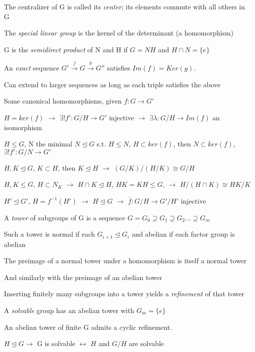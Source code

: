 \documentclass[12pt]{article}
\begin{document}
The centralizer of G is called its \textit{center}; its elements commute with all others in G

\noindent
The \textit{special linear group} is the kernel of the determinant (a homomorphism)

\noindent
G is the \textit{semidirect product} of N and H if $G=NH$ and $H\cap N = \{e\}$

\noindent
An \textit{exact} sequence $G' \xrightarrow{f} G \xrightarrow{g} G''$ satisfies $Im(f) = Ker(g)$.

Can extend to larger sequences as long as each triple satisfies the above

\noindent
Some canonical homomorphisms, given $f: G \to G'$

$H = ker(f)$ $\to$ $\exists !f': G\slash H \to G'$ injective $\to$ $\exists\lambda: G\slash H \to Im(f)$ an isomorphism

$H \leq G$, N the minimal $N \trianglelefteq G$ s.t. $H \leq N$, $H \subset ker(f)$, then $N \subset ker(f)$, $\exists ! f': G\slash N \to G'$

$H, K \trianglelefteq G$, $K \subset H$, then $K \trianglelefteq H$ $\to$ $(G\slash K)\slash (H \slash K) \cong G \slash H$

$H, K \leq G$, $H \subset N_K$ $\to$ $H \cap K \trianglelefteq H$, $HK = KH \leq G$, $\to$ $H\slash(H\cap K) \cong HK\slash K$

$H' \trianglelefteq G'$, $H = f^{-1}(H')$ $\to$ $H \trianglelefteq G$ $\to$ $\overline{f}: G\slash H \to G'\slash H'$ injective

\noindent
A \textit{tower} of subgroups of G is a sequence $G = G_0 \supseteq G_1 \supseteq G_2 ... \supseteq G_m$

Such a tower is normal if each $G_{i+1} \trianglelefteq G_i$ and abelian if each factor group is abelian

The preimage of a normal tower under a homomorphism is itself a normal tower

And similarly with the preimage of an abelian tower

Inserting finitely many subgroups into a tower yields a \textit{refinement} of that tower

A \textit{solvable} group has an abelian tower with $G_m = \{e\}$

\noindent
An abelian tower of finite G admits a cyclic refinement.

\noindent
$H \trianglelefteq G \to$ G is solvable $\leftrightarrow$ $H$ and $G\slash H$ are solvable
\end{document}
